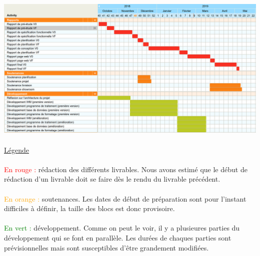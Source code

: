 \paragraph{}
\begin{mdframed}[frametitle={Figure 12 : Estimation de la planification des tâches}, innerbottommargin=10]
\begin{center}
\includegraphics[scale=0.6]{gantt.png}
\end{center}
\end{mdframed}

\paragraph{}
\underline{Légende}

\paragraph{}
\textcolor{red}{En rouge : } rédaction des différents livrables. Nous avons estimé que le début de rédaction d’un livrable doit se faire dès le rendu du livrable précédent.

\paragraph{}
\textcolor{orange}{En orange : } soutenances. Les dates de début de préparation sont pour l’instant difficiles à définir, la taille des blocs est donc provisoire.

\paragraph{}
\textcolor{green}{En vert : } développement. Comme on peut le voir, il y a plusieures parties du développement qui se font en parallèle. Les durées de chaques parties sont prévisionnelles mais sont susceptibles d’être grandement modifiées.

